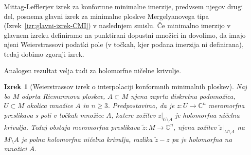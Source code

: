 \documentclass[12pt,a4paper,twoside]{article}
\newcommand{\literatura}{literatura}  %
\theoremstyle{definition} %
\theoremstyle{plain} %
\newtheorem{izrek}[definicija]{Izrek}
\numberwithin{equation}{section}  %
\newcommand{\C}{\mathbb C}
\begin{document}
Mittag-Lefflerjev izrek za konformne minimalne imerzije, predvsem njegov drugi del, posnema glavni izrek za minimalne ploskve Mergelyanovega tipa (Izrek~\ref{izr:glavni-izrek-CMI}) v naslednjem smislu. Če minimalno imerzijo v glavnem izreku definiramo na punktirani dopustni množici in dovolimo, da imajo njeni Weierstrassovi podatki pole (v točkah, kjer podana imerzija ni definirana), tedaj dobimo zgornji izrek.

Analogen rezultat velja tudi za holomorfne ničelne krivulje.

\begin{izrek} [Weierstrassov izrek o interpolaciji konformnih minimalnih ploskev] \label{izr:Weierstrass-CMI}
Naj bo $M$ odprta Riemannova ploskev, $A \subset M$ njena zaprta diskretna podmnožica, $U \subset M$ okolica množice $A$ in $n \geq 3$.
Predpostavimo, da je $z \colon U \to \C^{n}$ meromorfna preslikava s poli v točkah množice $A$, katere zožitev $z|_{U \setminus A}$ je holomorfna ničelna krivulja.
Tedaj obstaja meromorfna preslikava $\tilde{z} \colon M \to \C^{n}$, njena zožitev $\tilde{z}|_{M \setminus A}$ na $M \setminus A$ je polna holomorfna ničelna krivulja, razlika $\tilde{z}-z$ pa je holomorfna na množici $A$.
\end{izrek}



\cleardoublepage                           %

\cleardoublepage                           %
\printindex
\end{document}
